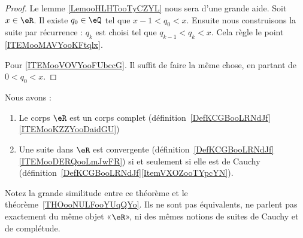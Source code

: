 \begin{proof}
	Le lemme \ref{LemooHLHTooTyCZYL} nous sera d'une grande aide. Soit \( x\in \eR\). Il existe \( q_0\in \eQ\) tel que \( x-1<q_0<x\). Ensuite nous construisons la suite par récurrence : \( q_k\) est choisi tel que \( q_{k-1}<q_k<x\). Cela règle le point \ref{ITEMooMAVYooKFtqlx}.

	Pour \ref{ITEMooVOVYooFUbccG}. Il suffit de faire la même chose, en partant de \( 0<q_0<x\).
\end{proof}

\begin{theorem} \label{THOooUFVJooYJlieh}
	Nous avons :
	\begin{enumerate}
		\item
		      Le corps \( \eR\) est un corps complet (définition~\ref{DefKCGBooLRNdJf}\ref{ITEMooKZZYooDaidGU})
		\item
		      Une suite dans \( \eR\) est convergente (définition~\ref{DefKCGBooLRNdJf}\ref{ITEMooDERQooLmJwFR}) si et seulement si elle est de Cauchy (définition~\ref{DefKCGBooLRNdJf}\ref{ItemVXOZooTYpcYN}).
	\end{enumerate}
\end{theorem}
Notez la grande similitude entre ce théorème et le théorème~\ref{THOooNULFooYUqQYo}. Ils ne sont pas équivalents, ne parlent pas exactement du même objet «\( \eR\)», ni des mêmes notions de suites de Cauchy et de complétude.

